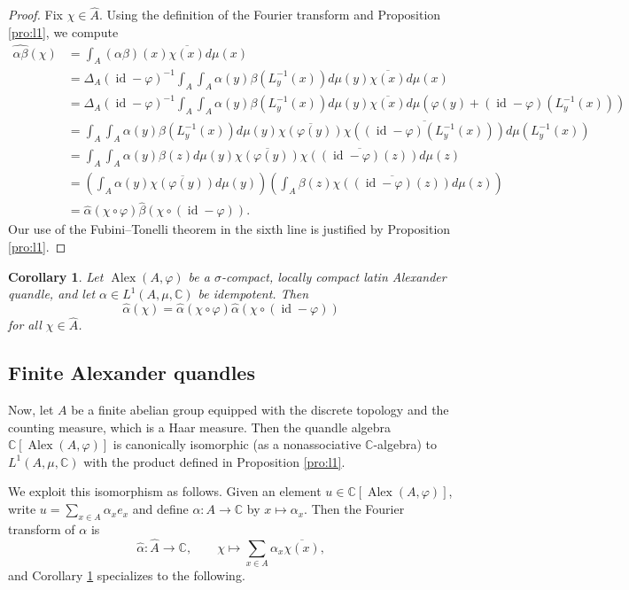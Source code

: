 \documentclass[12pt]{amsart}
\newtheorem{cor}[thm]{Corollary}
\theoremstyle{definition}
\theoremstyle{remark}
\newcommand{\Id}{\operatorname{id}}
\newcommand{\C}{\mathbb{C}}
\newcommand{\A}{\widehat{A}}
\newcommand{\Alpha}{\widehat{\alpha}}
\renewcommand{\phi}{\varphi}
\def\Alex{\operatorname{Alex}}
\begin{document}
\begin{proof}
    Fix $\chi\in\A$. Using the definition of the Fourier transform and Proposition \ref{pro:l1}, we compute
    \begin{align*}
        \widehat{\alpha\beta}(\chi)&=\int_{A}(\alpha\beta)(x)\overline{\chi(x)} d\mu(x) \\
        &=\Delta_A(\Id-\phi)^{-1} \int_{A}\int_{ A}\alpha (y)   \beta(L_{y}^{-1}(x))d\mu(y)\overline{\chi(x)} d\mu(x) \\
        &=\Delta_A(\Id-\phi)^{-1} \int_{A}\int_{ A}\alpha (y)   \beta(L_{y}^{-1}(x))d\mu(y)\overline{\chi(x)} d\mu(\phi(y)+(\Id-\phi)(L_y^{-1}(x)))\\
        &=  \int_{A}\int_{ A}\alpha (y)   \beta(L_{y}^{-1}(x))d\mu(y)\overline{\chi(\phi(y))}\overline{\chi((\Id-\phi)(L_y^{-1}(x)))} d\mu(  L_y^{-1}(x))\\
        &=  \int_{A}\int_{ A}\alpha (y)   \beta(z)d\mu(y)\overline{\chi(\phi(y))}\overline{\chi((\Id-\phi)(z))} d\mu(  z)\\
        &=\left(\int_{  A}\alpha (y)\overline {\chi(\phi(y))} d\mu(y)\right) \left(\int_{  A}\beta(z)\overline {\chi((\Id-\phi)(z))} d\mu(z)\right)\\
        &=\Alpha(\chi\circ\phi)\hat{\beta}(\chi\circ(\Id-\phi)).
    \end{align*}
  Our use of the Fubini--Tonelli theorem in the sixth line is justified by Proposition \ref{pro:l1}.
\end{proof}

\begin{cor}\label{cor:l1}
    Let $\Alex(A,\varphi)$ be a $\sigma$-compact, locally compact latin Alexander quandle, and let $\alpha \in L^1(A,\mu,\mathbb{C}) $ be idempotent. Then
\[\Alpha(\chi) = \Alpha(\chi\circ\varphi) \Alpha(\chi\circ (\Id - \varphi))\]
for all $\chi\in\A$.
\end{cor}

\subsection{Finite Alexander quandles}
Now, let $A$ be a finite abelian group equipped with the discrete topology and the counting measure, which is a Haar measure. Then the quandle algebra $\C[\Alex(A,\phi)]$ is canonically isomorphic (as a nonassociative $\C$-algebra) to $L^1(A,\mu,\mathbb{C})$ with the product defined in Proposition \ref{pro:l1}.

We exploit this isomorphism as follows. Given an element $u\in \C[\Alex(A,\phi)]$, write $u=\sum_{x\in A}\alpha_xe_x$ and define $\alpha\colon A\to\C$ by $x\mapsto \alpha_x$. Then the Fourier transform of $\alpha$ is
\begin{equation}\label{eq:ft}
    \Alpha\colon \A\to\C,\qquad \chi\mapsto \sum_{x\in A}\alpha_x\overline{\chi(x)},
\end{equation}
and Corollary \ref{cor:l1} specializes to the following.
\end{document}
